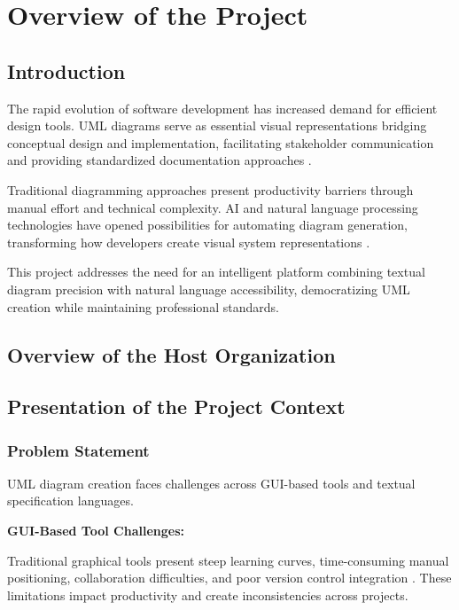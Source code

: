\chapter[Overview]{Overview of the Project}

\minitoc

\section{Introduction}

The rapid evolution of software development has increased demand for efficient design tools. UML diagrams serve as essential visual representations bridging conceptual design and implementation, facilitating stakeholder communication and providing standardized documentation approaches \cite{uml_importance}.

Traditional diagramming approaches present productivity barriers through manual effort and technical complexity. AI and natural language processing technologies have opened possibilities for automating diagram generation, transforming how developers create visual system representations \cite{ai_diagramming}.

This project addresses the need for an intelligent platform combining textual diagram precision with natural language accessibility, democratizing UML creation while maintaining professional standards.

\section{Overview of the Host Organization}

\section{Presentation of the Project Context}

\subsection{Problem Statement}

UML diagram creation faces challenges across GUI-based tools and textual specification languages.

\textbf{GUI-Based Tool Challenges:}

Traditional graphical tools present steep learning curves, time-consuming manual positioning, collaboration difficulties, and poor version control integration \cite{gui_limitations}. These limitations impact productivity and create inconsistencies across projects.

